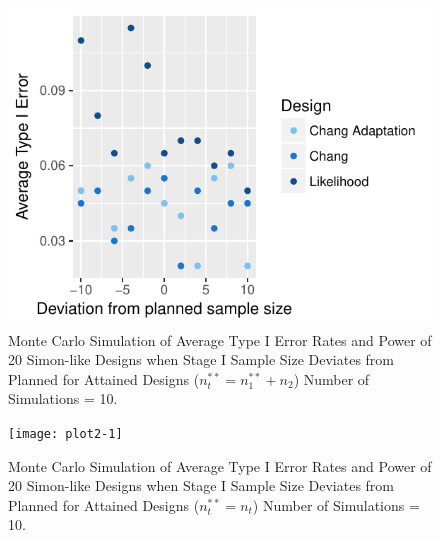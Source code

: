 \documentclass[12pt]{report}\usepackage[]{graphicx}\usepackage[]{color}
\newlength{\li}\setlength{\li}{14.48pt}
\begin{document}
% 
\begin{landscape}
\begin{figure}[]
\caption{Monte Carlo Simulation of Average Type I Error Rates and Power of 20 Simon-like Designs when Stage I Sample Size Deviates from Planned for Attained Designs ($n_t^{\ast\ast} = n_1^{\ast\ast} + n_2$) Number of Simulations = 10.}
\centering
\begin{Schunk}


\centerline{\includegraphics{plot1-1} }

\end{Schunk}
\end{figure}
\end{landscape}


\begin{landscape}
\begin{figure}[]
\caption{Monte Carlo Simulation of Average Type I Error Rates and Power of 20 Simon-like Designs when Stage I Sample Size Deviates from Planned for Attained Designs ($n_t^{\ast\ast} = n_t$) Number of Simulations = 10.}
\begin{Schunk}


\centerline{\texttt{[image: plot2-1]} }

\end{Schunk}
\end{figure}
\end{landscape}
\end{document}
